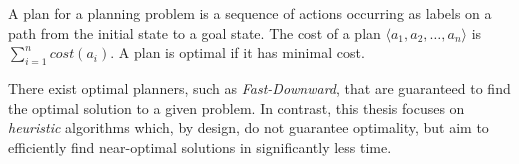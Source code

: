 \begin{definition}[Plan]
	\label{def:plan}
	A plan for a planning problem is a sequence of actions occurring as labels on a path
	from the initial state to a goal state.
	The cost of a plan $\langle a_1, a_2, \dots, a_n \rangle$ is $\sum_{i = 1}^n cost(a_i)$.
	A plan is optimal if it has minimal cost.
\end{definition}

There exist optimal planners, such as \textit{Fast-Downward}, that are guaranteed to find the optimal solution to a given problem.
In contrast, this thesis focuses on \textit{heuristic} algorithms which, by design, do not
guarantee optimality, but aim to efficiently find near-optimal solutions in significantly less time.

